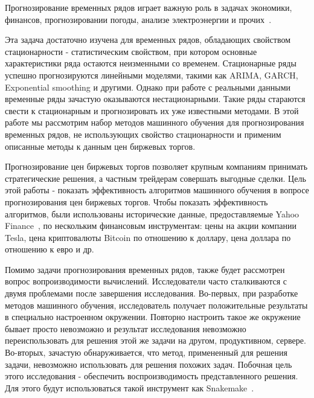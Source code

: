 \documentclass[a4paper,article,14pt]{extarticle}
\begin{document}


\tableofcontents
\pagebreak


Прогнозирование временных рядов играет важную роль в задачах экономики, финансов, прогнозировании погоды, анализе электроэнергии и прочих~\cite{ts25}.

Эта задача достаточно изучена для временных рядов, обладающих свойством стационарности - статистическим свойством, при котором основные характеристики ряда остаются неизменными со временем.
Стационарные ряды успешно прогнозируются линейными моделями, такими как ARIMA, GARCH, Exponential smoothing и другими. %
Однако при работе с реальными данными временные ряды зачастую оказываются нестационарными.
Такие ряды стараются свести к стационарным и прогнозировать их уже известными методами.
В этой работе мы рассмотрим набор методов машинного обучения для прогнозирования временных рядов, не использующих свойство стационарности и применим описанные методы к данным цен биржевых торгов.
\par

Прогнозирование цен биржевых торгов позволяет крупным компаниям принимать стратегические решения, а частным трейдерам совершать выгодные сделки.
Цель этой работы - показать эффективность алгоритмов машинного обучения в вопросе прогнозирования цен биржевых торгов.
Чтобы показать эффективность алгоритмов, были использованы исторические данные, предоставляемые Yahoo Finance~\cite{yahoo},
по нескольким финансовым инструментам: цены на акции компании Tesla,
цена криптовалюты Bitcoin по отношению к доллару, цена доллара по отношению к евро и др. %
\par

Помимо задачи прогнозирования временных рядов, также будет рассмотрен вопрос вопроизводимости вычислений.
Исследователи часто сталкиваются с двумя проблемами после завершения исследования.
Во-первых, при разработке методов машинного обучения, исследователь получает положительные результаты в специально настроенном окружении.
Повторно настроить такое же окружение бывает просто невозможно и результат исследования невозможно переиспользовать для решения этой же задачи на другом, продуктивном, сервере.
Во-вторых, зачастую обнаруживается, что метод, примененный для решения задачи, невозможно использовать для решения похожих задач.
Побочная цель этого исследования - обеспечить воспроизводимость представленного решения.
Для этого будут использоваться такой инструмент как Snakemake~\cite{snakemake}.
\end{document}
